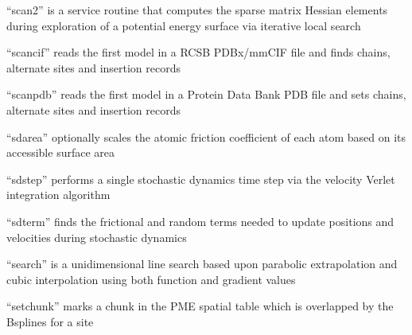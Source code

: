 \documentclass[letterpaper,11pt,english]{sphinxmanual}
\begin{document}
\sphinxAtStartPar
{}

\sphinxAtStartPar
“scan2” is a service routine that computes the sparse matrix Hessian elements during exploration of a potential energy surface via iterative local search

\sphinxAtStartPar
{}

\sphinxAtStartPar
“scancif” reads the first model in a RCSB PDBx/mmCIF file and finds chains, alternate sites and insertion records

\sphinxAtStartPar
{}

\sphinxAtStartPar
“scanpdb” reads the first model in a Protein Data Bank PDB file and sets chains, alternate sites and insertion records

\sphinxAtStartPar
{}

\sphinxAtStartPar
“sdarea” optionally scales the atomic friction coefficient of each atom based on its accessible surface area

\sphinxAtStartPar
{}

\sphinxAtStartPar
“sdstep” performs a single stochastic dynamics time step via the velocity Verlet integration algorithm

\sphinxAtStartPar
{}

\sphinxAtStartPar
“sdterm” finds the frictional and random terms needed to update positions and velocities during stochastic dynamics

\sphinxAtStartPar
{}

\sphinxAtStartPar
“search” is a unidimensional line search based upon parabolic extrapolation and cubic interpolation using both function and gradient values

\sphinxAtStartPar
{}

\sphinxAtStartPar
{}

\sphinxAtStartPar
{}

\sphinxAtStartPar
{}

\sphinxAtStartPar
{}

\sphinxAtStartPar
“setchunk” marks a chunk in the PME spatial table which is overlapped by the B\sphinxhyphen{}splines for a site
\end{document}
